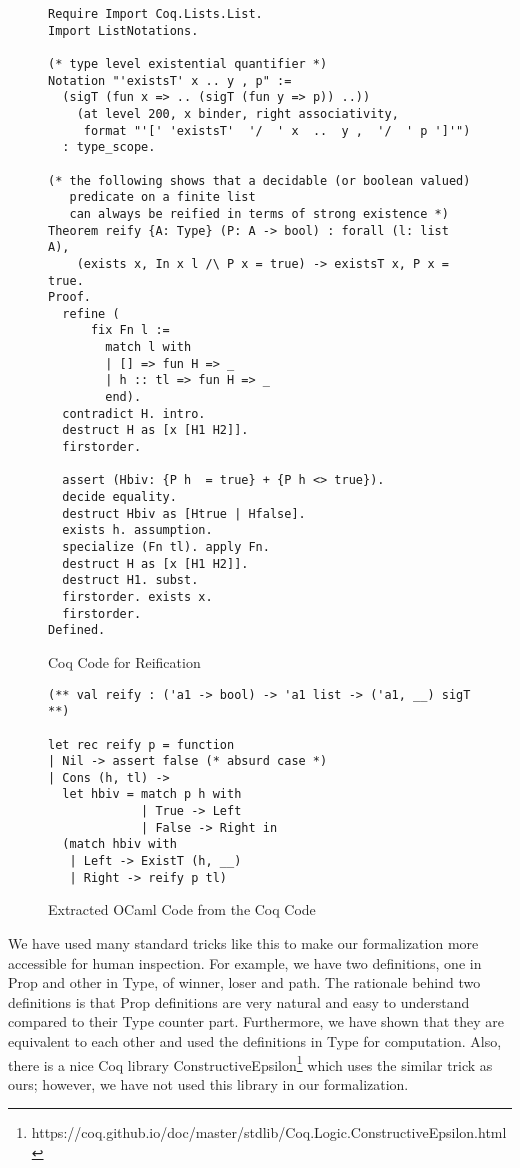 \begin{figure}
  
\begin{verbatim}
Require Import Coq.Lists.List.
Import ListNotations.

(* type level existential quantifier *)
Notation "'existsT' x .. y , p" :=
  (sigT (fun x => .. (sigT (fun y => p)) ..))
    (at level 200, x binder, right associativity,
     format "'[' 'existsT'  '/  ' x  ..  y ,  '/  ' p ']'")
  : type_scope.

(* the following shows that a decidable (or boolean valued) 
   predicate on a finite list
   can always be reified in terms of strong existence *)
Theorem reify {A: Type} (P: A -> bool) : forall (l: list A), 
    (exists x, In x l /\ P x = true) -> existsT x, P x = true.
Proof.
  refine (
      fix Fn l :=
        match l with
        | [] => fun H => _
        | h :: tl => fun H => _
        end).
  contradict H. intro.
  destruct H as [x [H1 H2]].
  firstorder.

  assert (Hbiv: {P h  = true} + {P h <> true}).
  decide equality.
  destruct Hbiv as [Htrue | Hfalse].
  exists h. assumption.
  specialize (Fn tl). apply Fn.
  destruct H as [x [H1 H2]].
  destruct H1. subst.
  firstorder. exists x.
  firstorder.
Defined. 
\end{verbatim}
\caption{Coq Code for Reification}
\label{sec:coq-reif}
\end{figure}

\begin{figure}
\begin{verbatim}
(** val reify : ('a1 -> bool) -> 'a1 list -> ('a1, __) sigT **)

let rec reify p = function
| Nil -> assert false (* absurd case *)
| Cons (h, tl) ->
  let hbiv = match p h with
             | True -> Left
             | False -> Right in
  (match hbiv with
   | Left -> ExistT (h, __)
   | Right -> reify p tl)
\end{verbatim}
\caption{Extracted OCaml Code from the Coq Code}
\label{sec:ocaml-reif}
\end{figure}
    
   
   
  We have used many standard tricks like this  
  to make  our formalization more accessible for human inspection.
  For example, we have two definitions, one in Prop and other in Type, 
  of winner, loser and path. The rationale behind two definitions 
  is that Prop definitions are very natural and easy to understand 
  compared to their Type counter part. Furthermore, we have shown that they are 
  equivalent to each other and used the definitions in Type for
  computation.  Also, there is a nice Coq library 
  ConstructiveEpsilon\footnote{https://coq.github.io/doc/master/stdlib/Coq.Logic.ConstructiveEpsilon.html}
  which uses the similar trick as ours; however, we have not used this library in 
  our formalization. 

